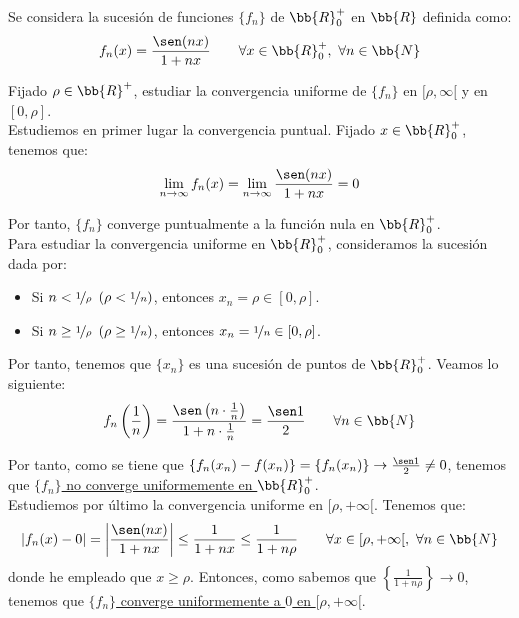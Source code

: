 \begin{ejercicio}
    Se considera la sucesión de funciones $\{f_n\}$ de $\bb{R}_0^+$ en $\bb{R}$ definida como:
    \begin{equation*}
        f_n(x) = \frac{\sen (nx)}{1+nx} \qquad \forall x\in \bb{R}_0^+,~\forall n\in \bb{N}
    \end{equation*}

    Fijado $\rho\in \bb{R}^+$, estudiar la convergencia uniforme de $\{f_n\}$ en $[\rho, \infty[$ y en $[0,\rho]$.\\

    Estudiemos en primer lugar la convergencia puntual. Fijado $x\in \bb{R}_0^+$, tenemos que:
    \begin{equation*}
        \lim_{n\to \infty} f_n(x) = \lim_{n\to \infty} \frac{\sen (nx)}{1+nx} = 0
    \end{equation*}

    Por tanto, $\{f_n\}$ converge puntualmente a la función nula en $\bb{R}_0^+$.\\

    Para estudiar la convergencia uniforme en $\bb{R}_0^+$, consideramos la sucesión dada por:
    \begin{itemize}
        \item Si $n < \nicefrac{1}{\rho}~\left(\rho < \nicefrac{1}{n}\right)$, entonces $x_n = \rho \in [0,\rho]$.
        \item Si $n \geq \nicefrac{1}{\rho}~\left(\rho \geq \nicefrac{1}{n}\right)$, entonces $x_n = \nicefrac{1}{n}\in [0,\rho]$.
    \end{itemize}
    Por tanto, tenemos que $\{x_n\}$ es una sucesión de puntos de $\bb{R}_0^+$. Veamos lo siguiente:
    \begin{equation*}
        f_n\left(\frac{1}{n}\right) = \frac{\sen\left(n\cdot \frac{1}{n}\right)}{1+n\cdot \frac{1}{n}} = \frac{\sen 1}{2} \qquad \forall n\in \bb{N}
    \end{equation*}

    Por tanto, como se tiene que $\{f_n(x_n)-f(x_n)\}=\{f_n(x_n)\}\to \frac{\sen 1}{2}\neq 0$, tenemos que \ul{$\{f_n\}$ no converge uniformemente en $\bb{R}_0^+$}.\\

    Estudiemos por último la convergencia uniforme en $[\rho,+\infty[$. Tenemos que:
    \begin{equation*}
        \left|f_n(x)-0\right| = \left|\frac{\sen (nx)}{1+nx}\right| \leq \frac{1}{1+nx} \leq \frac{1}{1+n\rho} \qquad \forall x\in [\rho,+\infty[,~\forall n\in \bb{N}
    \end{equation*}
    donde he empleado que $x\geq \rho$. Entonces, como sabemos que $\left\{\frac{1}{1+n\rho}\right\}\to 0$, tenemos que \ul{$\{f_n\}$ converge uniformemente a $0$ en $[\rho,+\infty[$}.
\end{ejercicio}